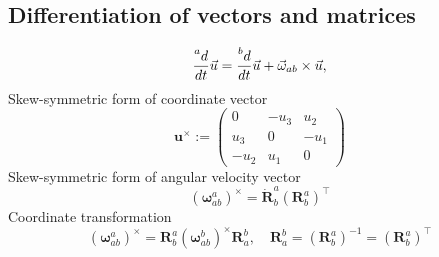 \subsection{Differentiation of vectors and matrices}
\begin{equation}
    \frac{\prescript{a}{}d}{dt} \vec{u} = \frac{\prescript{b}{}d}{dt} \vec{u} + \vec{\omega}_{ab} \times \vec{u},
\end{equation}
Skew-symmetric form of coordinate vector
\begin{equation}
    \mathbf{u}^\times := 
    \begin{pmatrix}
    0 & -u_3 & u_2\\
    u_3 & 0 & -u_1\\
    -u_2 & u_1 & 0
    \end{pmatrix}
\end{equation}
Skew-symmetric form of angular velocity vector
\begin{equation}
    (\boldsymbol{\omega}^a_{ab})^\times = \dot{\mathbf{R}}^a_b (\mathbf{R}^a_b)^\top
\end{equation}
Coordinate transformation
\begin{equation}
    (\boldsymbol{\omega}^a_{ab})^\times = \mathbf{R}^a_b (\boldsymbol{\omega}^b_{ab})^\times \mathbf{R}^b_a, \quad
    \mathbf{R}^b_a = (\mathbf{R}^a_b)^{-1} = (\mathbf{R}^a_b)^\top
\end{equation}

